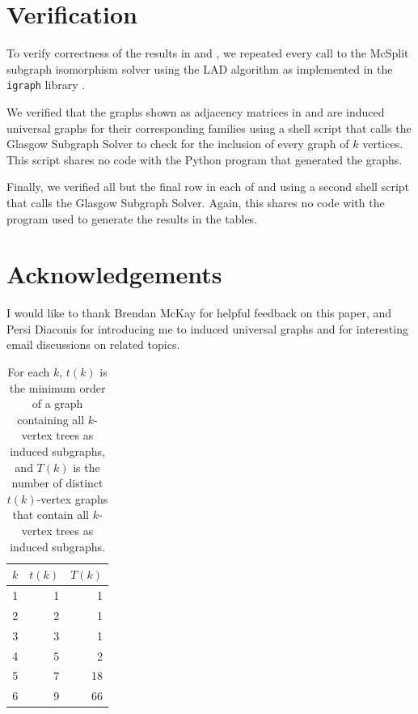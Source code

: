 \documentclass[12pt]{article}
\begin{document}
\section{Verification}\label{sec:verification}

To verify correctness of the results in
 and , we repeated every call to
the McSplit subgraph isomorphism solver using the LAD algorithm \cite{DBLP:journals/ai/Solnon10}
as implemented in the \texttt{igraph} library \cite{igraph}.

We verified that the graphs shown as adjacency matrices in 
and  are induced universal graphs for their corresponding families
using a shell script that calls the Glasgow Subgraph Solver \cite{DBLP:conf/cp/McCreeshP15,DBLP:conf/gg/McCreeshP020} to check for the
inclusion of every graph of $k$ vertices.
This script shares no code with the Python program that generated the graphs.

Finally, we verified all but the final row in each of 
and  using a second shell script that calls the Glasgow
Subgraph Solver.  Again, this shares no code with the program used to generate
the results in the tables.

\section{Acknowledgements}

I would like to thank Brendan McKay for helpful feedback on this paper, and Persi
Diaconis for introducing me to induced universal graphs and for interesting email
discussions on related topics.

\begin{table}[h!]
\centering
\begin{tabular}{r r r}
 \toprule
 $k$ & $t(k)$ & $T(k)$ \\ [0.5ex]
 \midrule
 1 & 1 & 1 \\
 2 & 2 & 1 \\
 3 & 3 & 1 \\
 4 & 5 & 2 \\
 5 & 7 & 18 \\
 6 & 9 & 66 \\
 \bottomrule
\end{tabular}
\caption{For each $k$, $t(k)$ is the minimum order of a graph containing all $k$-vertex trees as
induced subgraphs, and $T(k)$ is the number of distinct $t(k)$-vertex graphs that contain
all $k$-vertex trees as induced subgraphs.}
\label{tab:treeresults}
\end{table}
\end{document}
